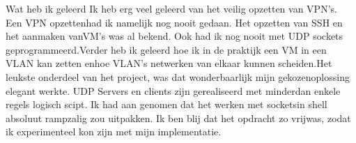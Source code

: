 Wat heb ik geleerd
Ik heb erg veel geleerd van het veilig opzetten van VPN’s. Een VPN opzettenhad ik namelijk nog nooit gedaan. Het opzetten van SSH en het aanmaken vanVM’s was al bekend. Ook had ik nog nooit met UDP sockets geprogrammeerd.Verder heb ik geleerd hoe ik in de praktijk een VM in een VLAN kan zetten enhoe VLAN’s netwerken van elkaar kunnen scheiden.Het leukste onderdeel van het project, was dat wonderbaarlijk mijn gekozenoplossing elegant werkte. UDP Servers en clients zijn gerealiseerd met minderdan enkele regels logisch scipt. Ik had aan genomen dat het werken met socketsin shell absoluut rampzalig zou uitpakken. Ik ben blij dat het opdracht zo vrijwas, zodat ik experimenteel kon zijn met mijn implementatie.



